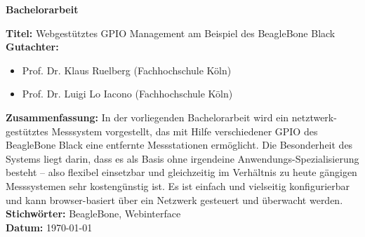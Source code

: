 \begin{center}
	\textbf{Bachelorarbeit}
\end{center}

\noindent \textbf{Titel:} Webgestütztes GPIO Management am Beispiel des BeagleBone Black\\

\noindent \textbf{Gutachter:}
\begin{itemize}
	\item Prof. Dr. Klaus Ruelberg (Fachhochschule Köln)
	\item Prof. Dr. Luigi Lo Iacono (Fachhochschule Köln)
\end{itemize}

\noindent \textbf{Zusammenfassung:} In der vorliegenden Bachelorarbeit wird ein netztwerk-gestütztes Messsystem vorgestellt, das mit Hilfe verschiedener GPIO des BeagleBone Black eine entfernte Messstationen ermöglicht. Die Besonderheit des Systems liegt darin, dass es als Basis ohne irgendeine Anwendungs-Spezialisierung besteht – also flexibel einsetzbar und gleichzeitig im Verhältnis zu heute gängigen Messsystemen sehr kostengünstig ist. Es ist einfach und vielseitig konfigurierbar und kann browser-basiert über ein Netzwerk gesteuert und überwacht werden.\\

\noindent \textbf{Stichwörter:} BeagleBone, Webinterface\\
\noindent \textbf{Datum:} {\longdate \today}